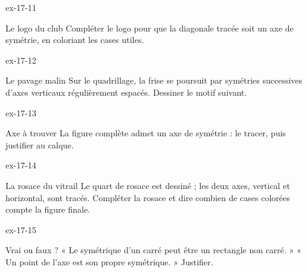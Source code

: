 \begin{blocLivre}{ex-17-11}\begin{exercice}[3]{Le logo du club}
Compléter le logo pour que la diagonale tracée soit un axe de symétrie, en coloriant les cases utiles.
\label{fig-ex-17-11}
\end{exercice}\end{blocLivre}
\begin{blocLivre}{ex-17-12}\begin{exercice}[3]{Le pavage malin}
Sur le quadrillage, la frise se poursuit par symétries successives d’axes verticaux régulièrement espacés. Dessiner le motif suivant.
\label{fig-ex-17-12}
\end{exercice}\end{blocLivre}
\begin{blocLivre}{ex-17-13}\begin{exercice}[3]{Axe à trouver}
La figure complète admet un axe de symétrie : le tracer, puis justifier au calque.
\label{fig-ex-17-13}
\end{exercice}\end{blocLivre}
\begin{blocLivre}{ex-17-14}\begin{exercice}[3]{La rosace du vitrail}
Le quart de rosace est dessiné ; les deux axes, vertical et horizontal, sont tracés. Compléter la rosace et dire combien de cases colorées compte la figure finale.
\label{fig-ex-17-14}
\end{exercice}\end{blocLivre}
\begin{blocLivre}{ex-17-15}\begin{exercice}[3]{Vrai ou faux ?}
« Le symétrique d’un carré peut être un rectangle non carré. » « Un point de l’axe est son propre symétrique. » Justifier.
\label{fig-ex-17-15}
\end{exercice}\end{blocLivre}

\clearpage
